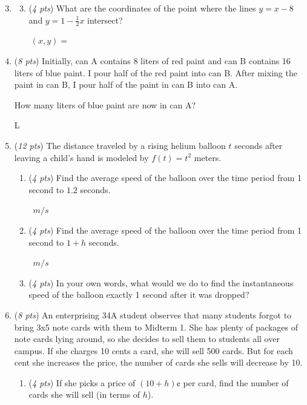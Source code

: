 \documentclass[12pt]{article}
\newcommand{\ansbox}[2]{\raisebox{-.5\height}{\framebox(#1,#2){}}}
\begin{document}
\pagebreak

\begin{enumerate} \setcounter{enumi}{2}
\item
\begin{enumerate} \setcounter{enumii}{2}

\item ({\it 4 pts}) What are the coordinates of the point where the lines $y=x-8$ and $y=1-\frac 1 2 x$ intersect?
\vfill

 \hfill$ \ (x,y)= \ $ \ansbox{200}{70}
\end{enumerate}


\item ({\it 8 pts}) Initially, can A contains 8 liters of red paint and can B contains 16 liters of blue paint. I pour half of the red paint into can B. After mixing the paint in can B, I pour half of the paint in can B into can A.




How many liters of blue paint are now in can A?
\vfill

 \hfill \ansbox{200}{70} L


\newpage

\item ({\it 12 pts})
The distance traveled by a rising helium balloon $t$ seconds after leaving a child's hand is modeled by $f(t) =t^2$ meters.
\begin{enumerate}
\item ({\it 4 pts})
Find the average speed of the balloon over the time period from 1 second to $1.2$ seconds.
\vfill

\hfill\ansbox{120}{70} \ $m/s$


\item ({\it 4 pts})
Find the average speed of the balloon over the time period from 1 second to $1+h$ seconds.
\vfill


\hfill\ansbox{200}{70} \ $m/s$


\item ({\it 4 pts})
In your own words, what would we do to find the instantaneous speed of the balloon exactly 1 second after it was dropped?



\hfill\ansbox{420}{70}


\end{enumerate}

\pagebreak
\item  ({\it 8 pts}) An enterprising 34A student observes that many students forgot to bring 3x5 note cards with them to Midterm 1. She has plenty of packages of note cards lying around, so she decides to sell them to students all over campus. If she charges 10 cents a card, she will sell 500 cards. But for each cent she increases the price, the number of cards she sells will decrease by 10.
\begin{enumerate}
\item ({\it 4 pts}) If she picks a price of $(10 + h)\cent$ per card, find the number of cards she will sell (in terms of $h$).
\vfill


\end{enumerate}
\end{enumerate}
\end{document}
